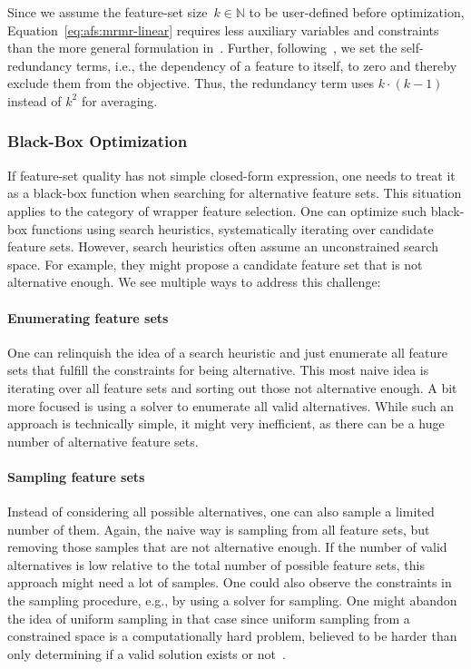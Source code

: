 \documentclass{article}
\theoremstyle{definition}
\begin{document}
Since we assume the feature-set size~$k \in \mathbb{N}$ to be user-defined before optimization, Equation~\ref{eq:afs:mrmr-linear} requires less auxiliary variables and constraints than the more general formulation in~\cite{nguyen2009optimizing, nguyen2010towards}.
Further, following~\cite{nguyen2014effective}, we set the self-redundancy terms, i.e., the dependency of a feature to itself, to zero and thereby exclude them from the objective.
Thus, the redundancy term uses $k \cdot (k-1)$ instead of $k^2$ for averaging.

\subsubsection{Black-Box Optimization}
\label{sec:afs:approach:objectives:black-box}

If feature-set quality has not simple closed-form expression, one needs to treat it as a black-box function when searching for alternative feature sets.
This situation applies to the category of wrapper feature selection.
One can optimize such black-box functions using search heuristics, systematically iterating over candidate feature sets.
However, search heuristics often assume an unconstrained search space.
For example, they might propose a candidate feature set that is not alternative enough.
We see multiple ways to address this challenge:

\paragraph{Enumerating feature sets}

One can relinquish the idea of a search heuristic and just enumerate all feature sets that fulfill the constraints for being alternative.
This most naive idea is iterating over all feature sets and sorting out those not alternative enough.
A bit more focused is using a solver to enumerate all valid alternatives.
While such an approach is technically simple, it might very inefficient, as there can be a huge number of alternative feature sets.

\paragraph{Sampling feature sets}

Instead of considering all possible alternatives, one can also sample a limited number of them.
Again, the naive way is sampling from all feature sets, but removing those samples that are not alternative enough.
If the number of valid alternatives is low relative to the total number of possible feature sets, this approach might need a lot of samples.
One could also observe the constraints in the sampling procedure, e.g., by using a solver for sampling.
One might abandon the idea of uniform sampling in that case since uniform sampling from a constrained space is a computationally hard problem, believed to be harder than only determining if a valid solution exists or not~\cite{ermon2012uniform}.
\end{document}
